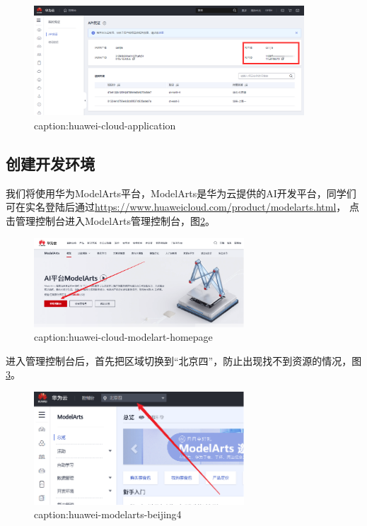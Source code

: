 \begin{figure}[htbp]
	\centering
	\includegraphics[width=0.9\textwidth]{figures/huawei-cloud-application.png}
	\caption{caption:huawei-cloud-application}
	\label{fig:huawei-cloud-application}
\end{figure}

\subsection{创建开发环境}

我们将使用华为ModelArts平台，ModelArts是华为云提供的AI开发平台，同学们可在实名登陆后通过\url{https://www.huaweicloud.com/product/modelarts.html}， 点击管理控制台进入ModelArts管理控制台，图\ref{fig:huawei-cloud-modelart-homepage}。
\begin{figure}[htbp]
	\centering
	\includegraphics[width=0.7\textwidth]{figures/huawei-cloud-modelart-homepage.png}
	\caption{caption:huawei-cloud-modelart-homepage}
	\label{fig:huawei-cloud-modelart-homepage}
\end{figure}

进入管理控制台后，首先把区域切换到“北京四”，防止出现找不到资源的情况，图\ref{fig:huawei-modelarts-beijing4}。
\begin{figure}[htbp]
	\centering
	\includegraphics[width=0.7\textwidth]{figures/huawei-modelarts-beijing4.png}
	\caption{caption:huawei-modelarts-beijing4}
	\label{fig:huawei-modelarts-beijing4}
\end{figure}

